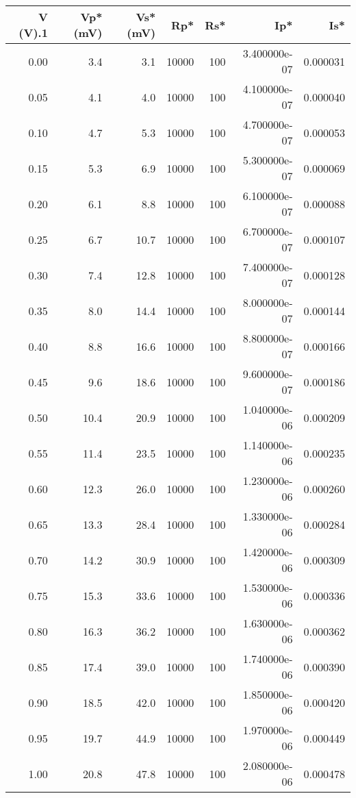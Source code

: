 \begin{tabular}{rrrrrrr}
\toprule
 V (V).1 &  Vp* (mV) &  Vs* (mV) &   Rp* &  Rs* &          Ip* &      Is* \\
\midrule
    0.00 &       3.4 &       3.1 & 10000 &  100 & 3.400000e-07 & 0.000031 \\
    0.05 &       4.1 &       4.0 & 10000 &  100 & 4.100000e-07 & 0.000040 \\
    0.10 &       4.7 &       5.3 & 10000 &  100 & 4.700000e-07 & 0.000053 \\
    0.15 &       5.3 &       6.9 & 10000 &  100 & 5.300000e-07 & 0.000069 \\
    0.20 &       6.1 &       8.8 & 10000 &  100 & 6.100000e-07 & 0.000088 \\
    0.25 &       6.7 &      10.7 & 10000 &  100 & 6.700000e-07 & 0.000107 \\
    0.30 &       7.4 &      12.8 & 10000 &  100 & 7.400000e-07 & 0.000128 \\
    0.35 &       8.0 &      14.4 & 10000 &  100 & 8.000000e-07 & 0.000144 \\
    0.40 &       8.8 &      16.6 & 10000 &  100 & 8.800000e-07 & 0.000166 \\
    0.45 &       9.6 &      18.6 & 10000 &  100 & 9.600000e-07 & 0.000186 \\
    0.50 &      10.4 &      20.9 & 10000 &  100 & 1.040000e-06 & 0.000209 \\
    0.55 &      11.4 &      23.5 & 10000 &  100 & 1.140000e-06 & 0.000235 \\
    0.60 &      12.3 &      26.0 & 10000 &  100 & 1.230000e-06 & 0.000260 \\
    0.65 &      13.3 &      28.4 & 10000 &  100 & 1.330000e-06 & 0.000284 \\
    0.70 &      14.2 &      30.9 & 10000 &  100 & 1.420000e-06 & 0.000309 \\
    0.75 &      15.3 &      33.6 & 10000 &  100 & 1.530000e-06 & 0.000336 \\
    0.80 &      16.3 &      36.2 & 10000 &  100 & 1.630000e-06 & 0.000362 \\
    0.85 &      17.4 &      39.0 & 10000 &  100 & 1.740000e-06 & 0.000390 \\
    0.90 &      18.5 &      42.0 & 10000 &  100 & 1.850000e-06 & 0.000420 \\
    0.95 &      19.7 &      44.9 & 10000 &  100 & 1.970000e-06 & 0.000449 \\
    1.00 &      20.8 &      47.8 & 10000 &  100 & 2.080000e-06 & 0.000478 \\

\end{tabular}
